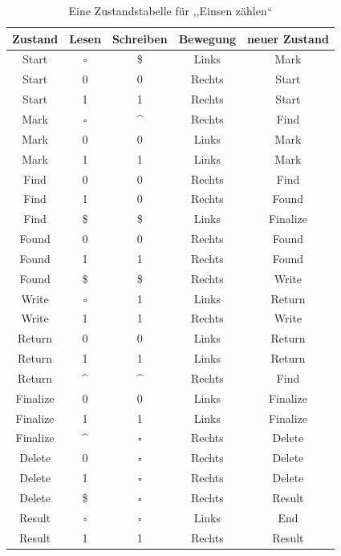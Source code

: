\begin{table}
 \begin{center}
  \begin{tabular}{ccccc}
   \hline
    Zustand & Lesen     & Schreiben & Bewegung & neuer Zustand \\
   \hline \hline
    Start   & $\square$ & \$        & Links    & Mark \\
    Start   & 0         & 0         & Rechts   & Start \\
    Start   & 1         & 1         & Rechts   & Start \\
    Mark    & $\square$ & \^{}      & Rechts   & Find \\
    Mark    & 0         & 0         & Links    & Mark \\
    Mark    & 1         & 1         & Links    & Mark \\
    Find    & 0         & 0         & Rechts   & Find \\
    Find    & 1         & 0         & Rechts   & Found \\
    Find    & \$        & \$        & Links    & Finalize \\
    Found   & 0         & 0         & Rechts   & Found \\
    Found   & 1         & 1         & Rechts   & Found \\
    Found   & \$        & \$        & Rechts   & Write \\
    Write   & $\square$ & 1         & Links    & Return \\
    Write   & 1         & 1         & Rechts   & Write \\
    Return  & 0         & 0         & Links    & Return \\
    Return  & 1         & 1         & Links    & Return \\
    Return  & \^{}      & \^{}      & Rechts   & Find \\
    Finalize& 0         & 0         & Links    & Finalize \\
    Finalize& 1         & 1         & Links    & Finalize \\
    Finalize& \^{}      & $\square$ & Rechts   & Delete \\
    Delete  & 0         & $\square$ & Rechts   & Delete \\
    Delete  & 1         & $\square$ & Rechts   & Delete \\
    Delete  & \$        & $\square$ & Rechts   & Result \\
    Result  & $\square$ & $\square$ & Links    & End \\
    Result  & 1         & 1         & Rechts   & Result \\
   \hline
  \end{tabular}
  \caption{Eine Zustandstabelle für ,,Einsen zählen``}
  \label{tab:count_ones}
 \end{center}
\end{table}

